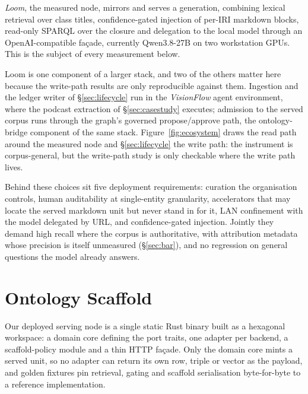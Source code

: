 \documentclass[10pt,twocolumn]{article}
\begin{document}
\emph{Loom}, the measured node, mirrors and serves a generation, combining lexical retrieval over class titles, confidence-gated injection of per-IRI markdown blocks, read-only SPARQL over the closure and delegation to the local model through an OpenAI-compatible fa\c{c}ade, currently Qwen3.8-27B on two workstation GPUs. This is the subject of every measurement below.

Loom is one component of a larger stack, and two of the others matter here because the write-path results are only reproducible against them. Ingestion and the ledger writer of \S\ref{sec:lifecycle} run in the \emph{VisionFlow} agent environment, where the podcast extraction of \S\ref{sec:casestudy} executes; admission to the served corpus runs through the graph's governed propose/approve path, the ontology-bridge component of the same stack. Figure~\ref{fig:ecosystem} draws the read path around the measured node and \S\ref{sec:lifecycle} the write path: the instrument is corpus-general, but the write-path study is only checkable where the write path lives.

Behind these choices sit five deployment requirements: curation the organisation controls, human auditability at single-entity granularity, accelerators that may locate the served markdown unit but never stand in for it, LAN confinement with the model delegated by URL, and confidence-gated injection. Jointly they demand high recall where the corpus is authoritative, with attribution metadata whose precision is itself unmeasured (\S\ref{sec:bar}), and no regression on general questions the model already answers.




\section{Ontology Scaffold}\label{sec:system}
Our deployed serving node is a single static Rust binary built as a hexagonal workspace: a domain core defining the port traits, one adapter per backend, a scaffold-policy module and a thin HTTP façade. Only the domain core mints a served unit, so no adapter can return its own row, triple or vector as the payload, and golden fixtures pin retrieval, gating and scaffold serialisation byte-for-byte to a reference implementation.
\end{document}

